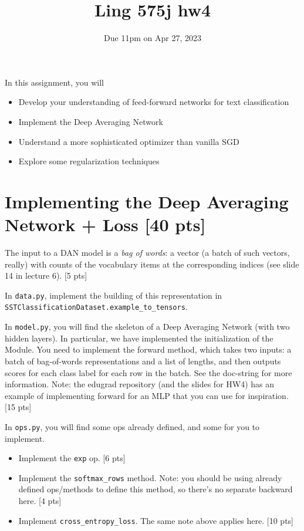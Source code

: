 \documentclass[11pt]{article}
\begin{document}
\title{Ling 575j hw4}
\date{\vspace{-0.2in}Due 11pm on Apr 27, 2023}
\maketitle


\noindent In this assignment, you will 
\begin{itemize}
  \item Develop your understanding of feed-forward networks for text classification
  \item Implement the Deep Averaging Network
  \item Understand a more sophisticated optimizer than vanilla SGD
  \item Explore some regularization techniques
\end{itemize}


\section{Implementing the Deep Averaging Network + Loss [40 pts]}

  The input to a DAN model is a \emph{bag of words}: a vector (a batch of such vectors, really) with counts of the vocabulary items at the corresponding indices (see slide 14 in lecture 6).   \hfill [5 pts]

\noindent In \texttt{data.py}, implement the building of this representation in \texttt{SSTClassificationDataset.example\_to\_tensors}.

\vspace{2em}
  In \texttt{model.py}, you will find the skeleton of a Deep Averaging Network (with two hidden layers).  In particular, we have implemented the initialization of the Module.  You need to implement the forward method, which takes two inputs: a batch of bag-of-words representations and a list of lengths, and then outputs scores for each class label for each row in the batch.  See the doc-string for more information.  Note: the edugrad repository (and the slides for HW4) has an example of implementing forward for an MLP that you can use for inspiration. \hfill [15 pts]


\vspace{2em}
  In \texttt{ops.py}, you will find some ops already defined, and some for you to implement.
\begin{itemize}
  \item Implement the \texttt{exp} op. \hfill [6 pts]
  \item Implement the \texttt{softmax\_rows} method.  Note: you should be using already defined ops/methods to define this method, so there's no separate backward here. \hfill [4 pts]
  \item Implement \texttt{cross\_entropy\_loss}.  The same note above applies here. \hfill [10 pts]
\end{itemize}
\end{document}
